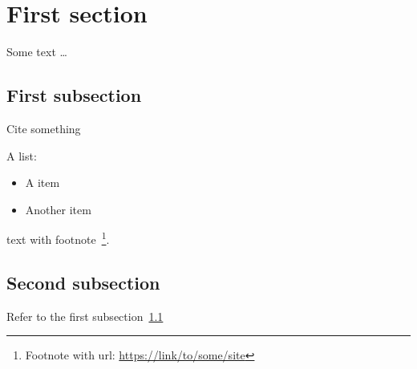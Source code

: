 \section{First section}
Some text \dots

\subsection{First subsection}
\label{sec:first}
Cite something~\cite{online1}

A list:
\begin{itemize}
  \item A item
  \item Another item
\end{itemize}

text with footnote~\footnote{Footnote with url: \url{https://link/to/some/site}}.

\subsection{Second subsection}
\label{sec:second}
Refer to the first subsection~\ref{sec:first}